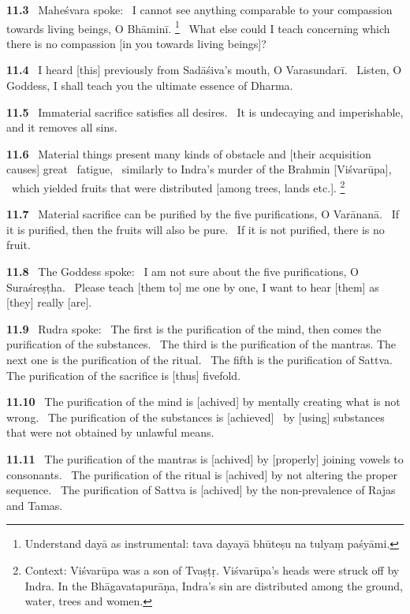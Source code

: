 \documentclass{article}
\begin{document}
\textbf{11.3}%
\ Maheśvara spoke:%
\ I cannot see anything comparable to your compassion towards living beings, O Bhāminī.%
\footnote{Understand dayā as instrumental: tava dayayā bhūteṣu na tulyaṃ paśyāmi. }%
\ What else could I teach concerning which there is no compassion [in you towards living beings]?%


\textbf{11.4}%
\ I heard [this] previously from Sadāśiva's mouth, O Varasundarī.%
\ Listen, O Goddess, I shall teach you the ultimate essence of Dharma.%


\textbf{11.5}%
\ Immaterial sacrifice satisfies all desires.%
\ It is undecaying and imperishable, and it removes all sins.%


\textbf{11.6}%
\ Material things present many kinds of obstacle and [their acquisition causes] great%
\                      fatigue,%
\ similarly to Indra's murder of the Brahmin [Viśvarūpa],%
\              which yielded fruits that were distributed [among trees, lands etc.].%
\footnote{Context: Viśvarūpa was a son of Tvaṣṭṛ. Viśvarūpa's heads were struck off by Indra.                          In the Bhāgavatapurāṇa, Indra's sin are distributed among the ground,                          water, trees and women. }%


\textbf{11.7}%
\ Material sacrifice can be purified by the five purifications, O Varānanā.%
\ If it is purified, then the fruits will also be pure.%
\              If it is not purified, there is no fruit.%


\textbf{11.8}%
\ The Goddess spoke:%
\ I am not sure about the five purifications, O Suraśreṣṭha.%
\ Please teach [them to] me one by one, I want to hear [them] as [they] really [are].%


\textbf{11.9}%
\ Rudra spoke:%
\ The first is the purification of the mind, then comes the purification of the substances.%
\ The third is the purification of the mantras. The next one is the purification of the ritual.%
\ The fifth is the purification of Sattva. The purification of the sacrifice is [thus] fivefold.%


\textbf{11.10}%
\ The purification of the mind is [achived] by mentally creating what is not wrong.%
\ The purification of the substances is [achieved]%
\                         by [using] substances that were not obtained by unlawful means.%


\textbf{11.11}%
\ The purification of the mantras is [achived] by [properly] joining vowels to consonants.%
\ The purification of the ritual is [achived] by not altering the proper sequence.%
\ The purification of Sattva is [achived] by the non-prevalence of Rajas and Tamas.%
\end{document}
